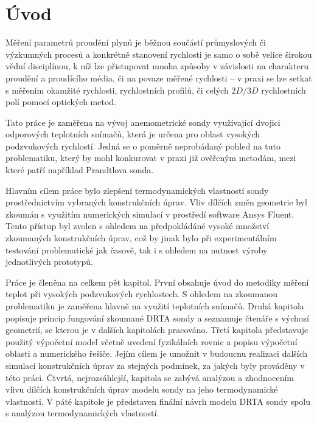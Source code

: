 \section*{Úvod}

    Měření parametrů proudění plynů je běžnou součástí průmyslových či výzkumných procesů a konkrétně stanovení rychlosti je samo o sobě velice širokou vědní disciplínou, k níž lze přistupovat mnoha způsoby v závislosti na charakteru proudění a proudícího média, či na povaze měřené rychlosti – v praxi se lze setkat s měřením okamžité rychlosti, rychlostních profilů, či celých $2D/3D$ rychlostních polí pomocí optických metod. 
    
    Tato práce je zaměřena na vývoj anemometrické sondy využívající dvojici odporových teplotních snímačů, která je určena pro oblast vysokých podzvukových rychlostí. Jedná se o poměrně neprobádaný pohled na tuto problematiku, který by mohl konkurovat v praxi již ověřeným metodám, mezi které patří například Prandtlova sonda.

    Hlavním cílem práce bylo zlepšení termodynamických vlastností sondy prostřednictvím vybraných konstrukčních úprav. Vliv dílčích změn geometrie byl zkoumán s využitím numerických simulací v prostředí software Ansys Fluent. Tento přístup byl zvolen s ohledem na předpokládáné vysoké množství zkoumaných konstrukčních úprav, což by jinak bylo při experimentálním testování problematické jak časově, tak i s ohledem na nutnost výroby jednotlivých prototypů.

    \vspace{\baselineskip}

    Práce je členěna na celkem pět kapitol. První obsahuje úvod do metodiky měření teplot při vysokých podzvukových rychlostech. S ohledem na zkoumanou problematiku je zaměřena hlavně na využití teplotních snímačů. Druhá kapitola popisuje princip fungování zkoumané DRTA sondy a seznamuje čtenáře s výchozí geometrií, se kterou je v dalších kapitolách pracováno. Třetí kapitola představuje použitý výpočetní model včetně uvedení fyzikálních rovnic a popisu výpočetní oblasti a numerického řešiče. Jejím cílem je umožnit v budoucnu realizaci dalších simulací konstrukčních úprav za stejných podmínek, za jakých byly prováděny v této práci. Čtvrtá, nejrozsáhlejší, kapitola se zabývá analýzou a zhodnocením vlivu dílčích konstrukčních úprav modelu sondy na jeho termodynamické vlastnosti. V páté kapitole je představen finální návrh modelu DRTA sondy spolu s analýzou termodynamických vlastností. 



    